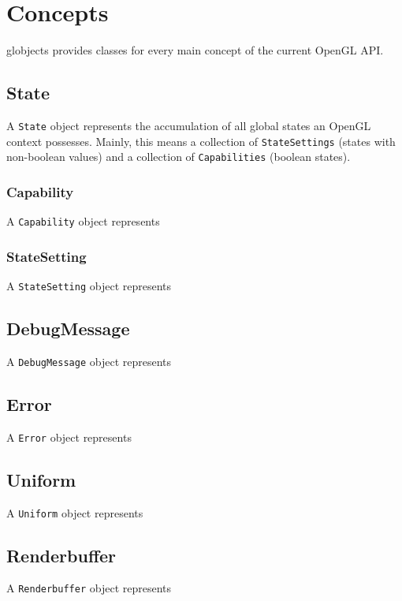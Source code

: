 \documentclass{article}
\begin{document}
\section{Concepts}

globjects provides classes for every main concept of the current OpenGL API.

\subsection{State}

A \verb|State| object represents the accumulation of all global states an OpenGL context possesses. Mainly, this means a collection of \verb|StateSettings| (states with non-boolean values) and a collection of \verb|Capabilities| (boolean states).

\subsubsection{Capability}

A \verb|Capability| object represents 

\subsubsection{StateSetting}

A \verb|StateSetting| object represents 

\subsection{DebugMessage}

A \verb|DebugMessage| object represents 

\subsection{Error}

A \verb|Error| object represents 

\subsection{Uniform}

A \verb|Uniform| object represents 

\subsection{Renderbuffer}

A \verb|Renderbuffer| object represents 
\end{document}
